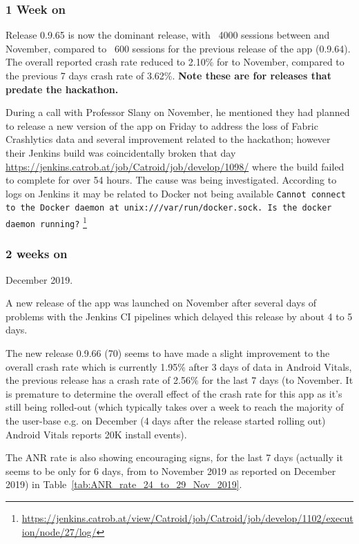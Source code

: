 \subsubsection{1 Week on}
Release 0.9.65 is now the dominant release, with ~4000 sessions between  and  November, compared to ~600 sessions for the previous release of the app (0.9.64). The overall reported crash rate reduced to 2.10\% for  to  November, compared to the previous 7 days crash rate of 3.62\%. \textbf{Note these are for releases that predate the hackathon.}

During a call with Professor Slany on  November, he mentioned they had planned to release a new version of the app on Friday to address the loss of Fabric Crashlytics data and several improvement related to the hackathon; however their Jenkins build was coincidentally broken that day \url{https://jenkins.catrob.at/job/Catroid/job/develop/1098/} where the build failed to complete for over 54 hours. The cause was being investigated. According to logs on Jenkins it may be related to Docker not being available \texttt{Cannot connect to the Docker daemon at unix:///var/run/docker.sock. Is the docker daemon running?} \footnote{\url{https://jenkins.catrob.at/view/Catroid/job/Catroid/job/develop/1102/execution/node/27/log/}}

\subsubsection{2 weeks on}
 December 2019.

A new release of the app was launched on November  after several days of problems with the Jenkins CI pipelines which delayed this release by about 4 to 5 days.

The new release 0.9.66 (70) seems to have made a slight improvement to the overall crash rate which is currently 1.95\% after 3 days of data in Android Vitals, the previous release has a crash rate of 2.56\% for the last 7 days (to  November. It is premature to determine the overall effect of the crash rate for this app as it's still being rolled-out (which typically takes over a week to reach the majority of the user-base e.g. on  December (4 days after the release started rolling out) Android Vitals reports 20K install events).

The ANR rate is also showing encouraging signs, for the last 7 days (actually it seems to be only for 6 days, from  to  November 2019 as reported on  December 2019) in Table~\ref{tab:ANR_rate_24_to_29_Nov_2019}.

